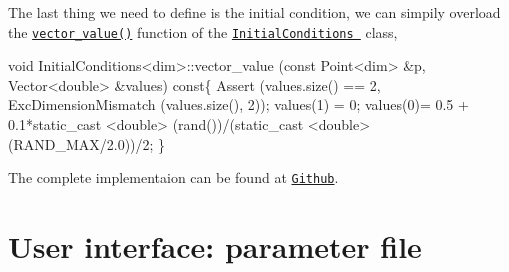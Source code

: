  The last thing we need to define is the initial condition, we can simpily overload the \href{../html/class_initial_conditions.html#aa10cfdd7350c3810a8deab707f397657}{\tt vector\-\_\-value()} function of the \href{../html/class_initial_conditions.html}{\tt Initial\-Conditions } class, 
\begin{DoxyCode}
\textcolor{keywordtype}{void} InitialConditions<dim>::vector_value (\textcolor{keyword}{const} Point<dim>   &p, Vector<double>   &values)\textcolor{keyword}{ const}\{
  Assert (values.size() == 2, ExcDimensionMismatch (values.size(), 2));
  values(1) = 0;    
  values(0)= 0.5 + 0.1*static\_cast <\textcolor{keywordtype}{double}> (rand())/(static\_cast <double>(RAND\_MAX/2.0))/2;
\}
\end{DoxyCode}
 The complete implementaion can be found at \href{https://github.com/mechanoChem/mechanoChemFEM/tree/example/Example1_diffusion_eaction}{\tt Github}.\hypertarget{growth_file}{}\section{User interface\-: parameter file}\label{growth_file}

